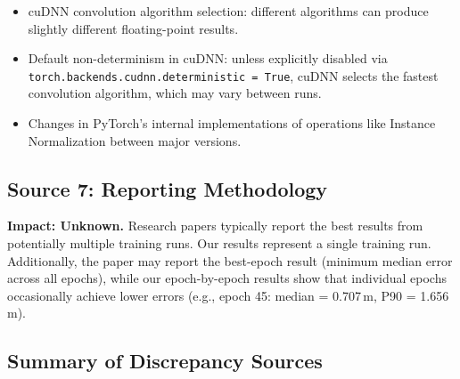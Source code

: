 \documentclass[12pt,a4paper]{article}
\begin{document}
\begin{itemize}[nosep]
    \item cuDNN convolution algorithm selection: different algorithms can produce slightly different floating-point results.
    \item Default non-determinism in cuDNN: unless explicitly disabled via \texttt{torch.backends.cudnn.deterministic = True}, cuDNN selects the fastest convolution algorithm, which may vary between runs.
    \item Changes in PyTorch's internal implementations of operations like Instance Normalization between major versions.
\end{itemize}

\subsection{Source 7: Reporting Methodology}

\textbf{Impact: Unknown.} Research papers typically report the best results from potentially multiple training runs. Our results represent a single training run. Additionally, the paper may report the best-epoch result (minimum median error across all epochs), while our epoch-by-epoch results show that individual epochs occasionally achieve lower errors (e.g., epoch 45: median = 0.707\,m, P90 = 1.656\,m).

\subsection{Summary of Discrepancy Sources}
\end{document}
